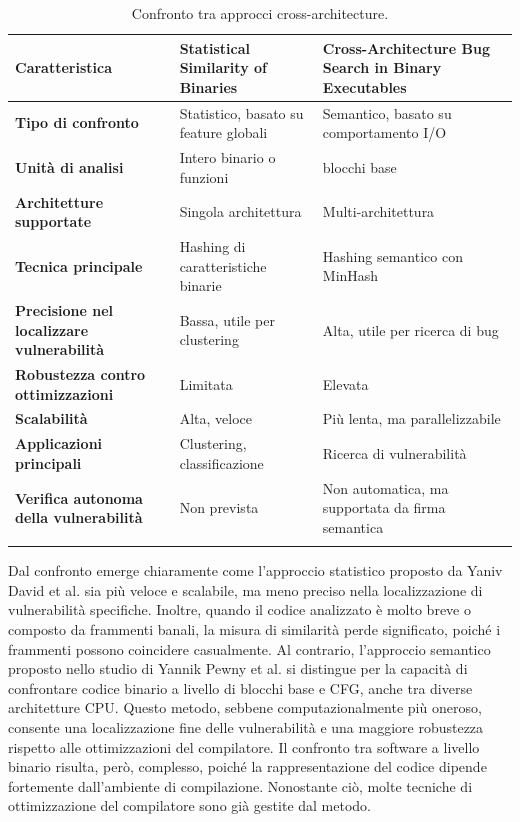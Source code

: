 \documentclass[12pt,a4paper,openright,twoside]{report}
\begin{document}
\renewcommand{\arraystretch}{1.3}
\begin{longtable}{|p{5cm}|p{4cm}|p{4cm}|}
\hline
\endfirsthead
\textbf{Caratteristica} & \textbf{Statistical Similarity of Binaries \cite{statisticalsob}} & \textbf{Cross-Architecture Bug Search in Binary Executables \cite{crossArchBugSearch}}\\
\hline
\textbf{Tipo di confronto}& Statistico, basato su feature globali & Semantico, basato su comportamento I/O\\
\hline
\textbf{Unità di analisi}& Intero binario o funzioni & blocchi base\\
\hline
\textbf{Architetture supportate}& Singola architettura& Multi-architettura\\
\hline
\textbf{Tecnica principale}& Hashing di caratteristiche binarie& Hashing semantico con MinHash\\
\hline
\textbf{Precisione nel localizzare vulnerabilità}& Bassa, utile per clustering& Alta, utile per ricerca di bug \\
\hline
\textbf{Robustezza contro ottimizzazioni}& Limitata& Elevata \\ 
\hline
\textbf{Scalabilità}& Alta, veloce& Più lenta, ma parallelizzabile\\
\hline
\textbf{Applicazioni principali}& Clustering, classificazione& Ricerca di vulnerabilità\\
\hline
\textbf{Verifica autonoma della vulnerabilità}& Non prevista & Non automatica, ma supportata da firma semantica\\
\hline
\caption{Confronto tra approcci cross-architecture.}
\label{confrontoTrad}
\end{longtable}
\vspace{-3mm}
Dal confronto emerge chiaramente come l’approccio statistico proposto da Yaniv David et al. \cite{statisticalsob} sia più veloce e scalabile, ma meno preciso nella localizzazione di vulnerabilità specifiche. Inoltre, quando il codice analizzato è molto breve o composto da frammenti banali, la misura di similarità perde significato, poiché i frammenti possono coincidere casualmente.
Al contrario, l’approccio semantico proposto nello studio di Yannik Pewny et al. \cite{crossArchBugSearch} si distingue per la capacità di confrontare codice binario a livello di blocchi base e CFG, anche tra diverse architetture CPU. Questo metodo, sebbene computazionalmente più oneroso, consente una localizzazione fine delle vulnerabilità e una maggiore robustezza rispetto alle ottimizzazioni del compilatore. Il confronto tra software a livello binario risulta, però, complesso, poiché la rappresentazione del codice dipende fortemente dall’ambiente di compilazione. Nonostante ciò, molte tecniche di ottimizzazione del compilatore sono già gestite dal metodo.
\end{document}
